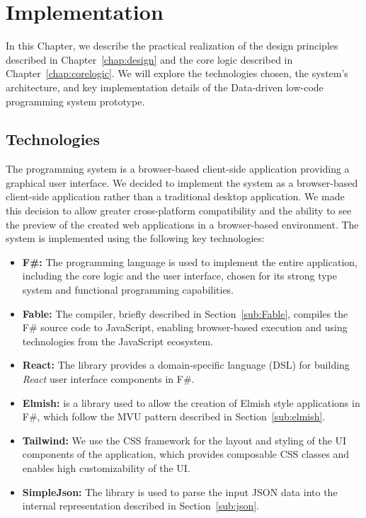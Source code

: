 \chapter{Implementation}
\label{chap:implementation}

In this Chapter, we describe the practical realization of the design principles described in Chapter~\ref{chap:design} and the core logic described in Chapter~\ref{chap:corelogic}.
We will explore the technologies chosen, the system's architecture, and key implementation details of the Data-driven low-code programming system prototype.


\section{Technologies}
\label{sec:technologies}

The programming system is a browser-based client-side application providing a graphical user interface.
We decided to implement the system as a browser-based client-side application rather than a traditional desktop application.
We made this decision to allow greater cross-platform compatibility and the ability to see the preview of the created web applications in a browser-based environment.
The system is implemented using the following key technologies:
\begin{itemize}
	\item \textbf{F\#:} The \citet{fsharp} programming language is used to implement the entire application, including the core logic and the user interface, chosen for its strong type system and functional programming capabilities.
	\item \textbf{Fable:} The \citet{fable} compiler, briefly described in Section~\ref{sub:Fable}, compiles the F\# source code to JavaScript, enabling browser-based execution and using technologies from the JavaScript ecosystem.
	\item \textbf{React:} The \citet{feliz} library provides a domain-specific language (DSL) for building \emph{React} user interface components in F\#.
	\item \textbf{Elmish:} \citet{elmish} is a library used to allow the creation of Elmish style applications in F\#, which follow the MVU pattern described in Section~\ref{sub:elmish}.
	\item \textbf{Tailwind:} We use the \citet{tailwind} CSS framework for the layout and styling of the UI components of the application, which provides composable CSS classes and enables high customizability of the UI.
	\item \textbf{SimpleJson:} The \citet{simpleJson} library is used to parse the input JSON data into the internal representation described in Section~\ref{sub:json}.
\end{itemize}

